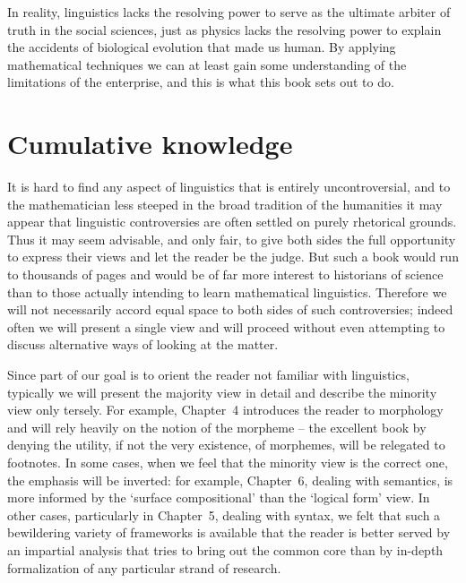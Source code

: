 \noindent
In reality, linguistics lacks the resolving power to serve as the ultimate
arbiter of truth in the social sciences, just as physics lacks the resolving
power to explain the accidents of biological evolution that made us human. By
applying mathematical techniques we can at least gain some understanding of
the limitations of the enterprise, and this is what this book sets out to do.

\section{Cumulative knowledge}

It is hard to find any aspect of linguistics that is entirely uncontroversial,
and to the mathematician less steeped in the broad tradition of the humanities
it may appear that linguistic controversies are often
settled on purely rhetorical grounds. Thus it may seem advisable, and only
fair, to give both sides the full opportunity to express their views and let
the reader be the judge. But such a book would run to thousands of pages and
would be of far more interest to historians of science than to those actually
intending to learn mathematical linguistics. Therefore we will not necessarily
accord equal space to both sides of such controversies; indeed often we will
present a single view and will proceed without even attempting to discuss
alternative ways of looking at the matter. 

Since part of our goal is to orient the reader not familiar with linguistics,
typically we will present the majority view in detail and describe the
minority view only tersely. For example, Chapter~4 introduces the reader to
morphology and will rely heavily on the notion of the morpheme
 -- the excellent book by  denying the
utility, if not the very existence, of morphemes, will be relegated to
footnotes. In some cases, when we feel that the minority view is the correct
one, the emphasis will be inverted: for example, Chapter~6, dealing with
semantics, is more informed by the `surface compositional' than the `logical
form' view. In other cases, particularly in Chapter~5, dealing with syntax, we
felt that such a bewildering variety of frameworks is available that the
reader is better served by an impartial analysis that tries to bring out the
common core than by in-depth formalization of any particular strand of
research. 

